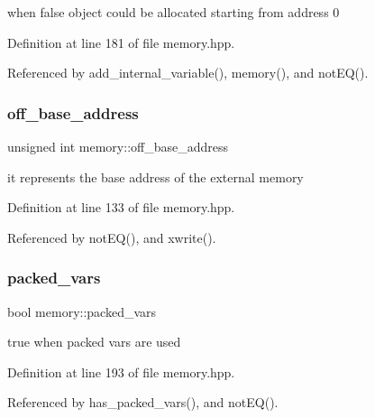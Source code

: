 when false object could be allocated starting from address 0 



Definition at line 181 of file memory.\+hpp.



Referenced by add\+\_\+internal\+\_\+variable(), memory(), and not\+E\+Q().

\mbox{\label{classmemory_ac97a5cf7a49915e6ca63883c30c0e599}} 
\subsubsection{\texorpdfstring{off\+\_\+base\+\_\+address}{off\_base\_address}}
{\footnotesize\ttfamily unsigned int memory\+::off\+\_\+base\+\_\+address\hspace{0.3cm}{\ttfamily [private]}}



it represents the base address of the external memory 



Definition at line 133 of file memory.\+hpp.



Referenced by not\+E\+Q(), and xwrite().

\mbox{\label{classmemory_afe6c94e7d3da0b12ac0bf2bbbf11d934}} 
\subsubsection{\texorpdfstring{packed\+\_\+vars}{packed\_vars}}
{\footnotesize\ttfamily bool memory\+::packed\+\_\+vars\hspace{0.3cm}{\ttfamily [private]}}



true when packed vars are used 



Definition at line 193 of file memory.\+hpp.



Referenced by has\+\_\+packed\+\_\+vars(), and not\+E\+Q().

\mbox{\label{classmemory_a8e55632ecceb2c57fc3a337997528bc1}} 
